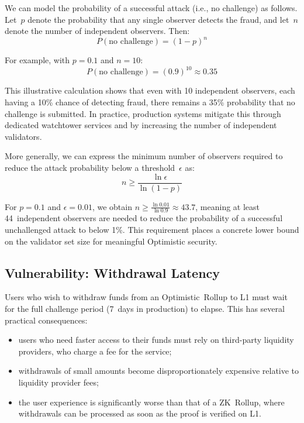 We can model the probability of a successful attack (i.e., no challenge) as follows. Let~$p$ denote the probability that any single observer detects the fraud, and let~$n$ denote the number of independent observers. Then:
\begin{equation}
P(\text{no challenge}) = (1 - p)^n
\end{equation}

For example, with $p = 0.1$ and $n = 10$:
\begin{equation}
P(\text{no challenge}) = (0.9)^{10} \approx 0.35
\end{equation}

This illustrative calculation shows that even with 10 independent observers, each having a 10\% chance of detecting fraud, there remains a 35\% probability that no challenge is submitted. In practice, production systems mitigate this through dedicated watchtower services and by increasing the number of independent validators.

More generally, we can express the minimum number of observers required to reduce the attack probability below a threshold~$\epsilon$ as:
\begin{equation}
n \geq \frac{\ln \epsilon}{\ln (1 - p)}
\end{equation}

For $p = 0.1$ and $\epsilon = 0.01$, we obtain $n \geq \frac{\ln 0.01}{\ln 0.9} \approx 43.7$, meaning at least 44~independent observers are needed to reduce the probability of a successful unchallenged attack to below 1\%. This requirement places a concrete lower bound on the validator set size for meaningful Optimistic security.

\subsection{Vulnerability: Withdrawal Latency}

Users who wish to withdraw funds from an Optimistic~Rollup to L1 must wait for the full challenge period (7~days in production) to elapse. This has several practical consequences:
\begin{itemize}
    \item users who need faster access to their funds must rely on third-party liquidity providers, who charge a fee for the service;
    \item withdrawals of small amounts become disproportionately expensive relative to liquidity provider fees;
    \item the user experience is significantly worse than that of a ZK~Rollup, where withdrawals can be processed as soon as the proof is verified on L1.
\end{itemize}

